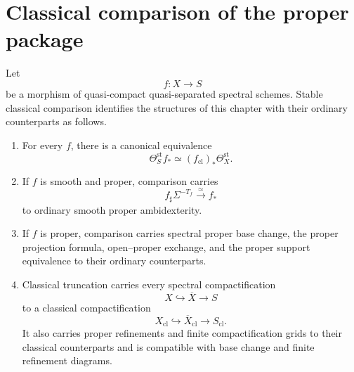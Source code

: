 \section{Classical comparison of the proper package}
\label{sec:proper-classical-comparison}

\begin{theorem}
\label{thm:proper-package-comparison}
Let
\[
    f:X\longrightarrow S
\]
be a morphism of quasi-compact quasi-separated spectral schemes.  Stable
classical comparison identifies the structures of this chapter with their
ordinary counterparts as follows.

\begin{enumerate}
    \item For every \(f\), there is a canonical equivalence
    \[
        \Theta_S^{\mathrm{st}}f_*
        \simeq
        (f_{\mathrm{cl}})_*
        \Theta_X^{\mathrm{st}}.
    \]

    \item If \(f\) is smooth and proper, comparison carries
    \[
        f_\sharp\Sigma^{-T_f}
        \xrightarrow{\simeq}
        f_*
    \]
    to ordinary smooth proper ambidexterity.

    \item If \(f\) is proper, comparison carries spectral proper base change,
    the proper projection formula, open--proper exchange, and the proper
    support equivalence to their ordinary counterparts.

    \item Classical truncation carries every spectral compactification
    \[
        X\hookrightarrow\overline X\longrightarrow S
    \]
    to a classical compactification
    \[
        X_{\mathrm{cl}}
        \hookrightarrow
        \overline X_{\mathrm{cl}}
        \longrightarrow
        S_{\mathrm{cl}}.
    \]
    It also carries proper refinements and finite compactification grids to
    their classical counterparts and is compatible with base change and
    finite refinement diagrams.
\end{enumerate}
\end{theorem}

